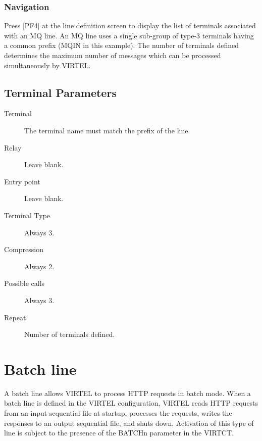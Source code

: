 \documentclass[letterpaper,10pt,english]{sphinxmanual}
\begin{document}
\subsubsection{Navigation}
\label{\detokenize{connectivity_guide:id9}}
Press {[}PF4{]} at the line definition screen to display the list of terminals associated with an MQ line. An MQ line uses a single sub-group of type-3 terminals having a common prefix (MQIN in this example). The number of terminals defined determines the maximum number of messages which can be processed simultaneously by VIRTEL.


\ignorespaces 

\subsection{Terminal Parameters}
\label{\detokenize{connectivity_guide:terminal-parameters}}\label{\detokenize{connectivity_guide:index-30}}\begin{description}
\item[{Terminal}] \leavevmode
The terminal name must match the prefix of the line.

\item[{Relay}] \leavevmode
Leave blank.

\item[{Entry point}] \leavevmode
Leave blank.

\item[{Terminal Type}] \leavevmode
Always 3.

\item[{Compression}] \leavevmode
Always 2.

\item[{Possible calls}] \leavevmode
Always 3.

\item[{Repeat}] \leavevmode
Number of terminals defined.

\end{description}

\newpage

\ignorespaces 

\section{Batch line}
\label{\detokenize{connectivity_guide:batch-line}}\label{\detokenize{connectivity_guide:index-31}}
A batch line allows VIRTEL to process HTTP requests in batch mode. When a batch line is defined in the VIRTEL configuration, VIRTEL reads HTTP requests from an input sequential file at startup, processes the requests, writes the responses to an output sequential file, and shuts down. Activation of this type of line is subject to the presence of the BATCHn parameter in the VIRTCT.
\end{document}
